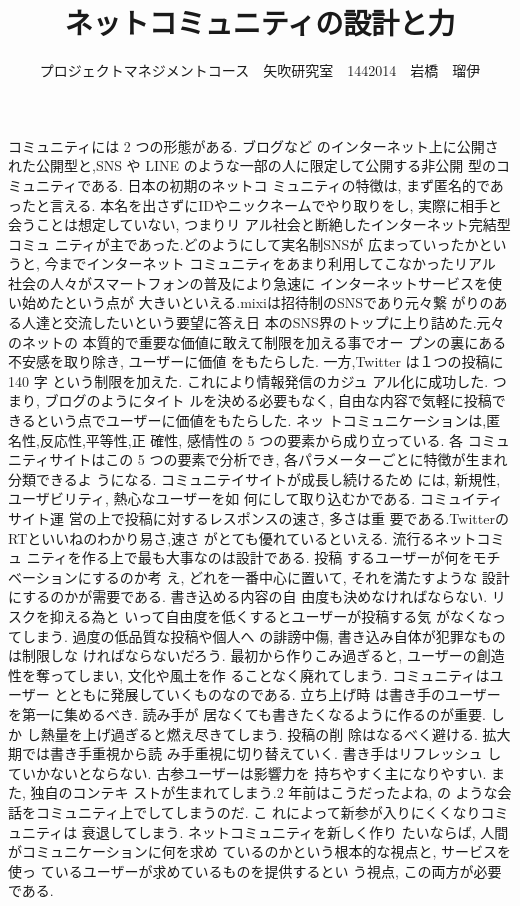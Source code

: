 \documentclass[uplatex,twocolumn,dvipdfmx]{jsarticle}
\title{\vspace{-5mm}\fontsize{14pt}{0pt}\selectfont ネットコミュニティの設計と力}
\author{\normalsize プロジェクトマネジメントコース　矢吹研究室　1442014　岩橋　瑠伊}
\date{}
\begin{document}
\fontsize{10.5pt}{\baselineskip}\selectfont
\maketitle





コミュニティには 2 つの形態がある. ブログなど のインターネット上に公開された公開型と,SNS や LINE のような一部の人に限定して公開する非公開 型のコミュニティである. 日本の初期のネットコ ミュニティの特徴は, まず匿名的であったと言える. 本名を出さずにIDやニックネームでやり取りをし, 実際に相手と会うことは想定していない, つまりリ アル社会と断絶したインターネット完結型コミュ ニティが主であった.どのようにして実名制SNSが 広まっていったかというと, 今までインターネット コミュニティをあまり利用してこなかったリアル 社会の人々がスマートフォンの普及により急速に インターネットサービスを使い始めたという点が 大きいといえる.mixiは招待制のSNSであり元々繋 がりのある人達と交流したいという要望に答え日 本のSNS界のトップに上り詰めた.元々のネットの 本質的で重要な価値に敢えて制限を加える事でオー プンの裏にある不安感を取り除き, ユーザーに価値 をもたらした. 一方,Twitter は１つの投稿に 140 字 という制限を加えた. これにより情報発信のカジュ アル化に成功した. つまり, ブログのようにタイト ルを決める必要もなく, 自由な内容で気軽に投稿で きるという点でユーザーに価値をもたらした. ネッ トコミュニケーションは,匿名性,反応性,平等性,正 確性, 感情性の 5 つの要素から成り立っている. 各 コミュニティサイトはこの 5 つの要素で分析でき, 各パラメーターごとに特徴が生まれ分類できるよ うになる. コミュニテイサイトが成長し続けるため には, 新規性, ユーザビリティ, 熱心なユーザーを如 何にして取り込むかである. コミュイティサイト運 営の上で投稿に対するレスポンスの速さ, 多さは重 要である.TwitterのRTといいねのわかり易さ,速さ がとても優れているといえる. 流行るネットコミュ ニティを作る上で最も大事なのは設計である. 投稿 するユーザーが何をモチベーションにするのか考 え, どれを一番中心に置いて, それを満たすような 設計にするのかが需要である. 書き込める内容の自 由度も決めなければならない. リスクを抑える為と
いって自由度を低くするとユーザーが投稿する気 がなくなってしまう. 過度の低品質な投稿や個人へ の誹謗中傷, 書き込み自体が犯罪なものは制限しな ければならないだろう. 最初から作りこみ過ぎると, ユーザーの創造性を奪ってしまい, 文化や風土を作 ることなく廃れてしまう. コミュニティはユーザー とともに発展していくものなのである. 立ち上げ時 は書き手のユーザーを第一に集めるべき. 読み手が 居なくても書きたくなるように作るのが重要. しか し熱量を上げ過ぎると燃え尽きてしまう. 投稿の削 除はなるべく避ける. 拡大期では書き手重視から読 み手重視に切り替えていく. 書き手はリフレッシュ していかないとならない. 古参ユーザーは影響力を 持ちやすく主になりやすい. また, 独自のコンテキ ストが生まれてしまう.2 年前はこうだったよね, の ような会話をコミュニティ上でしてしまうのだ. こ れによって新参が入りにくくなりコミュニティは 衰退してしまう. ネットコミュニティを新しく作り たいならば, 人間がコミュニケーションに何を求め ているのかという根本的な視点と, サービスを使っ ているユーザーが求めているものを提供するとい う視点, この両方が必要である.
\end{document}
